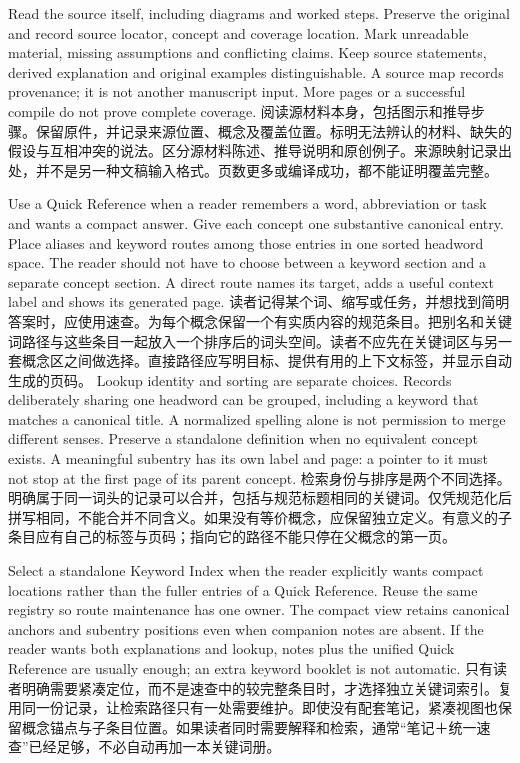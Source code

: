  {Read the source itself, including diagrams and worked steps. Preserve the original and record source locator, concept and coverage location. Mark unreadable material, missing assumptions and conflicting claims. Keep source statements, derived explanation and original examples distinguishable. A source map records provenance; it is not another manuscript input. More pages or a successful compile do not prove complete coverage.}
 {阅读源材料本身，包括图示和推导步骤。保留原件，并记录来源位置、概念及覆盖位置。标明无法辨认的材料、缺失的假设与互相冲突的说法。区分源材料陈述、推导说明和原创例子。来源映射记录出处，并不是另一种文稿输入格式。页数更多或编译成功，都不能证明覆盖完整。}

 {Use a Quick Reference when a reader remembers a word, abbreviation or task and wants a compact answer. Give each concept one substantive canonical entry. Place aliases and keyword routes among those entries in one sorted headword space. The reader should not have to choose between a keyword section and a separate concept section. A direct route names its target, adds a useful context label and shows its generated page.}
 {读者记得某个词、缩写或任务，并想找到简明答案时，应使用速查。为每个概念保留一个有实质内容的规范条目。把别名和关键词路径与这些条目一起放入一个排序后的词头空间。读者不应先在关键词区与另一套概念区之间做选择。直接路径应写明目标、提供有用的上下文标签，并显示自动生成的页码。}
 {Lookup identity and sorting are separate choices. Records deliberately sharing one headword can be grouped, including a keyword that matches a canonical title. A normalized spelling alone is not permission to merge different senses. Preserve a standalone definition when no equivalent concept exists. A meaningful subentry has its own label and page: a pointer to it must not stop at the first page of its parent concept.}
 {检索身份与排序是两个不同选择。明确属于同一词头的记录可以合并，包括与规范标题相同的关键词。仅凭规范化后拼写相同，不能合并不同含义。如果没有等价概念，应保留独立定义。有意义的子条目应有自己的标签与页码；指向它的路径不能只停在父概念的第一页。}

 {Select a standalone Keyword Index when the reader explicitly wants compact locations rather than the fuller entries of a Quick Reference. Reuse the same registry so route maintenance has one owner. The compact view retains canonical anchors and subentry positions even when companion notes are absent. If the reader wants both explanations and lookup, notes plus the unified Quick Reference are usually enough; an extra keyword booklet is not automatic.}
 {只有读者明确需要紧凑定位，而不是速查中的较完整条目时，才选择独立关键词索引。复用同一份记录，让检索路径只有一处需要维护。即使没有配套笔记，紧凑视图也保留概念锚点与子条目位置。如果读者同时需要解释和检索，通常“笔记＋统一速查”已经足够，不必自动再加一本关键词册。}

